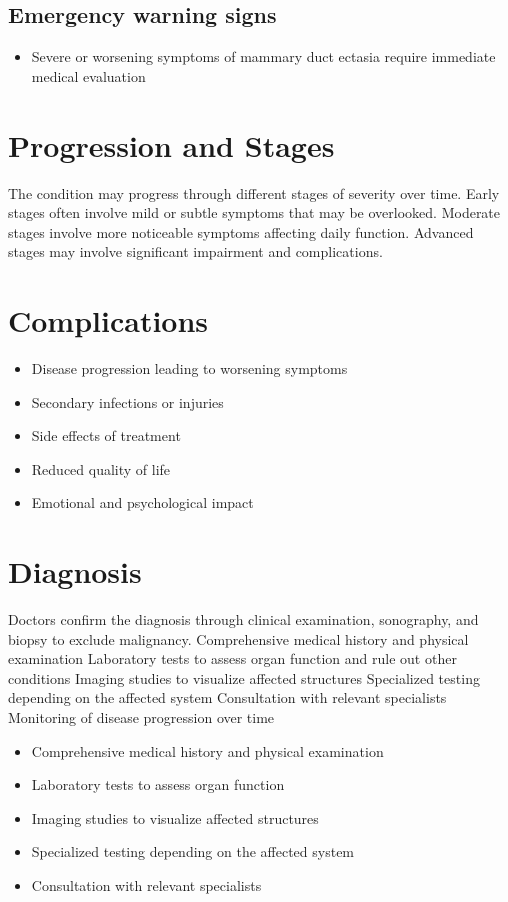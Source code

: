 \subsection{Emergency warning signs}
\begin{itemize}[noitemsep]
  \item Severe or worsening symptoms of mammary duct ectasia require immediate medical evaluation
\end{itemize}
\section{Progression and Stages}
The condition may progress through different stages of severity over time. Early stages often involve mild or subtle symptoms that may be overlooked. Moderate stages involve more noticeable symptoms affecting daily function. Advanced stages may involve significant impairment and complications.
\section{Complications}
\begin{itemize}[noitemsep]
  \item Disease progression leading to worsening symptoms
  \item Secondary infections or injuries
  \item Side effects of treatment
  \item Reduced quality of life
  \item Emotional and psychological impact
\end{itemize}
\section{Diagnosis}
Doctors confirm the diagnosis through clinical examination, sonography, and biopsy to exclude malignancy. Comprehensive medical history and physical examination Laboratory tests to assess organ function and rule out other conditions Imaging studies to visualize affected structures Specialized testing depending on the affected system Consultation with relevant specialists Monitoring of disease progression over time

\begin{itemize}[noitemsep]
  \item Comprehensive medical history and physical examination
  \item Laboratory tests to assess organ function
  \item Imaging studies to visualize affected structures
  \item Specialized testing depending on the affected system
  \item Consultation with relevant specialists
\end{itemize}

